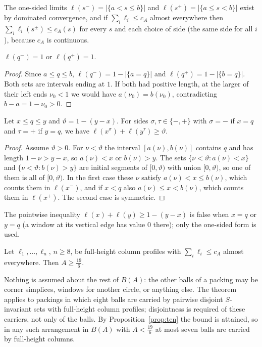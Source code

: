 \documentclass[11pt]{amsart}
\begin{document}
The one-sided limits $\ell(s^-)=|\{a<s\le b\}|$ and $\ell(s^+)=|\{a\le s<b\}|$ exist by dominated convergence, and
if $\sum_i\ell_i\le c_A$ almost everywhere then $\sum_i\ell_i(s^\pm)\le c_A(s)$ for every $s$ and each choice of
side (the same side for all $i$), because $c_A$ is continuous.

\begin{lemma}\label{lem:apex}
$\ell(q^-)=1$ or $\ell(q^+)=1$.
\end{lemma}

\begin{proof}
Since $a\le q\le b$, $\ell(q^-)=1-|\{a=q\}|$ and $\ell(q^+)=1-|\{b=q\}|$. Both sets are intervals ending at $1$. If
both had positive length, at the larger of their left ends $\nu_0<1$ we would have $a(\nu_0)=b(\nu_0)$, contradicting
$b-a=1-\nu_0>0$.
\end{proof}

\begin{lemma}\label{lem:twopoint}
Let $x\le q\le y$ and $\vartheta=1-(y-x)$. For sides $\sigma,\tau\in\{-,+\}$ with $\sigma=-$ if $x=q$ and $\tau=+$
if $y=q$, we have $\ell(x^\sigma)+\ell(y^\tau)\ge\vartheta$.
\end{lemma}

\begin{proof}
Assume $\vartheta>0$. For $\nu<\vartheta$ the interval $[a(\nu),b(\nu)]$ contains $q$ and has length
$1-\nu>y-x$, so $a(\nu)<x$ or $b(\nu)>y$. The sets $\{\nu<\vartheta:a(\nu)<x\}$ and $\{\nu<\vartheta:b(\nu)>y\}$ are
initial segments of $[0,\vartheta)$ with union $[0,\vartheta)$, so one of them is all of $[0,\vartheta)$. In the
first case these $\nu$ satisfy $a(\nu)<x\le b(\nu)$, which counts them in $\ell(x^-)$, and if $x<q$ also
$a(\nu)\le x<b(\nu)$, which counts them in $\ell(x^+)$. The second case is symmetric.
\end{proof}

The pointwise inequality $\ell(x)+\ell(y)\ge1-(y-x)$ is false when $x=q$ or $y=q$ (a window at its vertical edge
has value $0$ there); only the one-sided form is used.

\begin{theorem}\label{thm:eight}
Let $\ell_1,\dots,\ell_n$, $n\ge8$, be full-height column profiles with $\sum_i\ell_i\le c_A$ almost everywhere.
Then $A\ge\frac{19}6$.
\end{theorem}

Nothing is assumed about the rest of $B(A)$: the other balls of a packing may be corner simplices, windows for
another circle, or anything else. The theorem applies to packings in which eight balls are carried by pairwise
disjoint $S$-invariant sets with full-height column profiles; disjointness is required of these carriers, not
only of the balls. By Proposition~\ref{prop:ten} the bound is attained, so in any such arrangement in $B(A)$ with
$A<\frac{19}6$ at most seven balls are carried by full-height columns.
\end{document}
